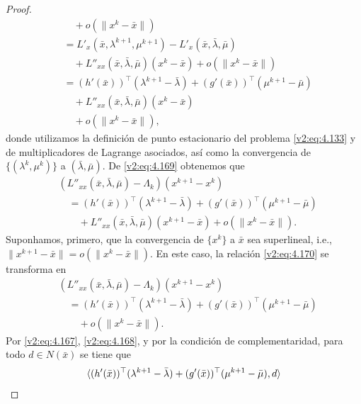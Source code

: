 \begin{proof}
\begin{align}
        &\quad + o(\|x^k - \bar{x}\|) \nonumber \\
        &= L'_x(\bar{x}, \lambda^{k+1}, \mu^{k+1}) - L'_x(\bar{x}, \bar{\lambda}, \bar{\mu}) \nonumber \\
        &\quad + L''_{xx}(\bar{x}, \bar{\lambda}, \bar{\mu})(x^k - \bar{x}) + o(\|x^k - \bar{x}\|) \nonumber \\
        &= (h'(\bar{x}))^\top(\lambda^{k+1} - \bar{\lambda}) + (g'(\bar{x}))^\top(\mu^{k+1} - \bar{\mu}) \nonumber \\
        &\quad + L''_{xx}(\bar{x}, \bar{\lambda}, \bar{\mu})(x^k - \bar{x}) \nonumber \\
        &\quad + o(\|x^k - \bar{x}\|),
        \label{v2:eq:4.169}
    \end{align}
    donde utilizamos la definición de punto estacionario del problema \eqref{v2:eq:4.133} y de multiplicadores de Lagrange asociados, así como la convergencia de $\{(\lambda^k, \mu^k)\}$ a $(\bar{\lambda}, \bar{\mu})$. De \eqref{v2:eq:4.169} obtenemos que
    \begin{align}
        &(L''_{xx}(\bar{x}, \bar{\lambda}, \bar{\mu}) - \Lambda_k)(x^{k+1} - x^k) \nonumber \\
        &\quad = (h'(\bar{x}))^\top(\lambda^{k+1} - \bar{\lambda}) + (g'(\bar{x}))^\top(\mu^{k+1} - \bar{\mu}) \nonumber \\
        &\qquad + L''_{xx}(\bar{x}, \bar{\lambda}, \bar{\mu})(x^{k+1} - \bar{x}) + o(\|x^k - \bar{x}\|).
        \label{v2:eq:4.170}
    \end{align}
    Suponhamos, primero, que la convergencia de $\{x^k\}$ a $\bar{x}$ sea superlineal, i.e., $\|x^{k+1} - \bar{x}\| = o(\|x^k - \bar{x}\|)$. En este caso, la relación \eqref{v2:eq:4.170} se transforma en
    \begin{align}
        &(L''_{xx}(\bar{x}, \bar{\lambda}, \bar{\mu}) - \Lambda_k)(x^{k+1} - x^k) \nonumber \\
        &\quad = (h'(\bar{x}))^\top(\lambda^{k+1} - \bar{\lambda}) + (g'(\bar{x}))^\top(\mu^{k+1} - \bar{\mu}) \nonumber \\
        &\qquad + o(\|x^k - \bar{x}\|).
        \label{v2:eq:4.171}
    \end{align}
    Por \eqref{v2:eq:4.167}, \eqref{v2:eq:4.168}, y por la condición de complementaridad, para todo $d \in N(\bar{x})$ se tiene que
    \begin{equation}
        \langle (h'(\bar{x}))^\top(\lambda^{k+1} - \bar{\lambda}) + (g'(\bar{x}))^\top(\mu^{k+1} - \bar{\mu}), d \rangle \nonumber \\

\end{equation}
\end{proof}
